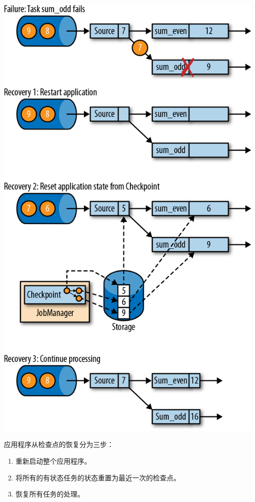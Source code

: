 \documentclass[oneside]{ctexbook}
\begin{document}
\noindent \includegraphics[width=\textwidth]{spaf_0318.png}

应用程序从检查点的恢复分为三步：

\begin{enumerate}
  \item 重新启动整个应用程序。
  \item 将所有的有状态任务的状态重置为最近一次的检查点。
  \item 恢复所有任务的处理。
\end{enumerate}
\end{document}
